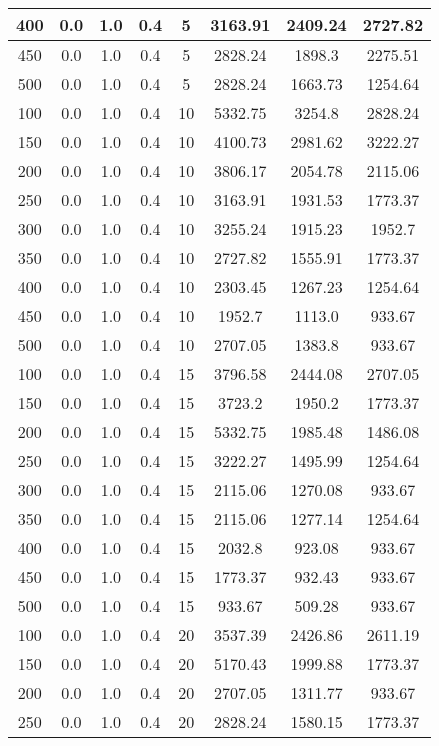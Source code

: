 \documentclass[a4paper, 12pt]{extreport}
\begin{document}
\begin{itemize}
\begin{longtable}{|c|c|c|c|c|c|c|c|}
			400 & 0.0 & 1.0 & 0.4 & 5 & 3163.91 & 2409.24 & 2727.82 \\\hline
			450 & 0.0 & 1.0 & 0.4 & 5 & 2828.24 & 1898.3 & 2275.51 \\\hline
			500 & 0.0 & 1.0 & 0.4 & 5 & 2828.24 & 1663.73 & 1254.64 \\\hline
			100 & 0.0 & 1.0 & 0.4 & 10 & 5332.75 & 3254.8 & 2828.24 \\\hline
			150 & 0.0 & 1.0 & 0.4 & 10 & 4100.73 & 2981.62 & 3222.27 \\\hline
			200 & 0.0 & 1.0 & 0.4 & 10 & 3806.17 & 2054.78 & 2115.06 \\\hline
			250 & 0.0 & 1.0 & 0.4 & 10 & 3163.91 & 1931.53 & 1773.37 \\\hline
			300 & 0.0 & 1.0 & 0.4 & 10 & 3255.24 & 1915.23 & 1952.7 \\\hline
			350 & 0.0 & 1.0 & 0.4 & 10 & 2727.82 & 1555.91 & 1773.37 \\\hline
			400 & 0.0 & 1.0 & 0.4 & 10 & 2303.45 & 1267.23 & 1254.64 \\\hline
			450 & 0.0 & 1.0 & 0.4 & 10 & 1952.7 & 1113.0 & 933.67 \\\hline
			500 & 0.0 & 1.0 & 0.4 & 10 & 2707.05 & 1383.8 & 933.67 \\\hline
			100 & 0.0 & 1.0 & 0.4 & 15 & 3796.58 & 2444.08 & 2707.05 \\\hline
			150 & 0.0 & 1.0 & 0.4 & 15 & 3723.2 & 1950.2 & 1773.37 \\\hline
			200 & 0.0 & 1.0 & 0.4 & 15 & 5332.75 & 1985.48 & 1486.08 \\\hline
			250 & 0.0 & 1.0 & 0.4 & 15 & 3222.27 & 1495.99 & 1254.64 \\\hline
			300 & 0.0 & 1.0 & 0.4 & 15 & 2115.06 & 1270.08 & 933.67 \\\hline
			350 & 0.0 & 1.0 & 0.4 & 15 & 2115.06 & 1277.14 & 1254.64 \\\hline
			400 & 0.0 & 1.0 & 0.4 & 15 & 2032.8 & 923.08 & 933.67 \\\hline
			450 & 0.0 & 1.0 & 0.4 & 15 & 1773.37 & 932.43 & 933.67 \\\hline
			500 & 0.0 & 1.0 & 0.4 & 15 & 933.67 & 509.28 & 933.67 \\\hline
			100 & 0.0 & 1.0 & 0.4 & 20 & 3537.39 & 2426.86 & 2611.19 \\\hline
			150 & 0.0 & 1.0 & 0.4 & 20 & 5170.43 & 1999.88 & 1773.37 \\\hline
			200 & 0.0 & 1.0 & 0.4 & 20 & 2707.05 & 1311.77 & 933.67 \\\hline
			250 & 0.0 & 1.0 & 0.4 & 20 & 2828.24 & 1580.15 & 1773.37 \\\hline

\end{longtable}
\end{itemize}
\end{document}
